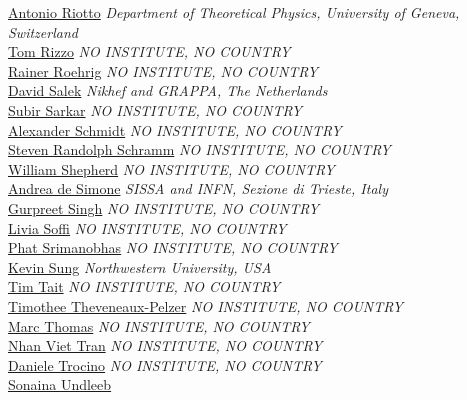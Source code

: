 \noindent\href{mailto:antonio.riotto@unige.ch}{Antonio Riotto} 
\emph{Department of Theoretical Physics, University of Geneva, Switzerland}\\
\noindent\href{mailto:rizzo@slac.stanford.edu}{Tom Rizzo} 
\emph{NO INSTITUTE, NO COUNTRY}\\
\noindent\href{mailto:rainer.roehrig@cern.ch}{Rainer Roehrig} 
\emph{NO INSTITUTE, NO COUNTRY}\\
\noindent\href{mailto:David.Salek@cern.ch}{David Salek} 
\emph{Nikhef and GRAPPA, The Netherlands}\\
\noindent\href{mailto:s.sarkar1@physics.ox.ac.uk}{Subir Sarkar} 
\emph{NO INSTITUTE, NO COUNTRY}\\
\noindent\href{mailto:Alexander.Schmidt@cern.ch}{Alexander Schmidt} 
\emph{NO INSTITUTE, NO COUNTRY}\\
\noindent\href{mailto:Steven.Schramm@cern.ch}{Steven Randolph Schramm} 
\emph{NO INSTITUTE, NO COUNTRY}\\
\noindent\href{mailto:will.shepherd@gmail.com}{William Shepherd} 
\emph{NO INSTITUTE, NO COUNTRY}\\
\noindent\href{mailto:andrea.desimone@sissa.it}{Andrea de Simone} 
\emph{SISSA and INFN, Sezione di Trieste, Italy}\\
\noindent\href{mailto:gurpreet.singh@cern.ch}{Gurpreet Singh} 
\emph{NO INSTITUTE, NO COUNTRY}\\
\noindent\href{mailto:Livia.Soffi@cern.ch}{Livia Soffi} 
\emph{NO INSTITUTE, NO COUNTRY}\\
\noindent\href{mailto:Norraphat.Srimanobhas@cern.ch}{Phat Srimanobhas} 
\emph{NO INSTITUTE, NO COUNTRY}\\
\noindent\href{mailto:kevin.kai.hong.sung@cern.ch}{Kevin Sung} 
\emph{Northwestern University, USA}\\
\noindent\href{mailto:ttait@uci.edu}{Tim Tait} 
\emph{NO INSTITUTE, NO COUNTRY}\\
\noindent\href{mailto:Timothee.Theveneaux-Pelzer@cern.ch}{Timothee Theveneaux-Pelzer} 
\emph{NO INSTITUTE, NO COUNTRY}\\
\noindent\href{mailto:mct1g11@soton.ac.uk}{Marc Thomas} 
\emph{NO INSTITUTE, NO COUNTRY}\\
\noindent\href{mailto:nhan.viet.tran@cern.ch}{Nhan Viet Tran} 
\emph{NO INSTITUTE, NO COUNTRY}\\
\noindent\href{mailto:Daniele.Trocino@cern.ch}{Daniele Trocino} 
\emph{NO INSTITUTE, NO COUNTRY}\\
\noindent\href{mailto:sonaina.undleeb@ttu.edu}{Sonaina Undleeb} 
